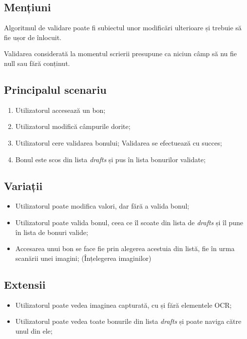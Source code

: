 \subsection{Mențiuni}\label{menux21biuni-1}

Algoritmul de validare poate fi subiectul unor modificări ulterioare și trebuie să fie ușor de înlocuit.

Validarea considerată la momentul scrierii presupune ca niciun câmp să nu fie null sau fără conținut.

\subsection{Principalul scenariu}\label{principalul-scenariu-1}

\begin{enumerate}
\item
  Utilizatorul accesează un bon;
\item
  Utilizatorul modifică câmpurile dorite;
\item
  Utilizatorul cere validarea bonului; Validarea se efectuează cu succes;
\item
  Bonul este scos din lista \emph{drafts} și pus în lista bonurilor validate;
\end{enumerate}

\subsection{Variații}\label{variaux21bii-1}

\begin{itemize}
\item
  Utilizatorul poate modifica valori, dar fără a valida bonul;
\item
  Utilizatorul poate valida bonul, ceea ce îl scoate din lista de \emph{drafts} și îl pune în lista de bonuri valide;
\item
  Accesarea unui bon se face fie prin alegerea acestuia din listă, fie în urma scanării unei imagini; (Înțelegerea imaginilor)
\end{itemize}

\subsection{Extensii}\label{extensii-1}

\begin{itemize}
\item
  Utilizatorul poate vedea imaginea capturată, cu și fără elementele OCR;
\item
  Utilizatorul poate vedea toate bonurile din lista \emph{drafts} și poate naviga către unul din ele;
\end{itemize}

